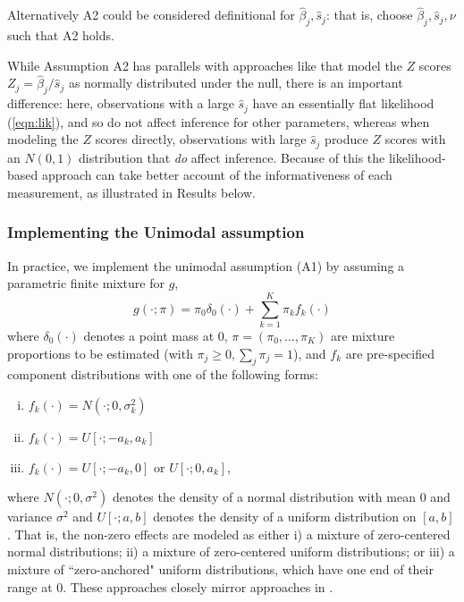 \documentclass[11pt]{article}
\def\bhat{\hat{\beta}}
\def\shat{\hat{s}}
\begin{document}
Alternatively A2 could be considered definitional for $\bhat_j,\shat_j$: that is, choose $\bhat_j,\shat_j,\nu$ such that A2 holds. 

While Assumption A2 has parallels with approaches like \cite{efron2008microarrays, sun2007oracle}
 that model the $Z$ scores $Z_j = \bhat_j/\shat_j$ as normally distributed under the null, 
there is an important difference: here, observations with a large $\shat_j$ have an essentially flat likelihood (\ref{eqn:lik}), and so do not affect inference for
other parameters, whereas when modeling the $Z$ scores directly, observations with large $\shat_j$ produce $Z$ scores with an $N(0,1)$ distribution that {\it do} affect inference. 
Because of this the likelihood-based approach can take better account of the informativeness of each measurement, as illustrated in Results below.


\subsubsection*{Implementing the Unimodal assumption}
 
In practice, we implement the unimodal assumption (A1) by assuming a parametric finite mixture for $g$, 
\begin{equation} \label{eqn:g}
g(\cdot; \pi) = \pi_0 \delta_0(\cdot) + \sum_{k=1}^K \pi_k f_k(\cdot) 
\end{equation}
where $\delta_0(\cdot)$ denotes a point mass at 0, $\pi=(\pi_0,\dots,\pi_K)$ are mixture proportions to be estimated (with $\pi_j \geq 0, \sum_j \pi_j=1$), and $f_k$ are pre-specified 
component distributions with one of the following forms: 
\begin{enumerate}[i)]
\item $f_k(\cdot) = N(\cdot; 0, \sigma^2_k)$
\item $f_k(\cdot) = U[\cdot; -a_k,a_k]$
\item $f_k(\cdot) = U[\cdot; -a_k,0] \text{ or } U[\cdot; 0,a_k]$,
\end{enumerate}
where $N(\cdot; 0,\sigma^2)$ denotes the density of a normal distribution with mean 0 and variance $\sigma^2$ and
$U[\cdot; a,b]$ denotes the density of a uniform distribution on $[a,b]$.
That is, the non-zero effects are modeled as either i) a mixture of zero-centered normal distributions; ii) a mixture of zero-centered uniform distributions;
or iii) a mixture of ``zero-anchored" uniform distributions, which have one end of their range at 0. These approaches closely mirror approaches in \cite{cordy1997deconvolution}.
 
\end{document}
